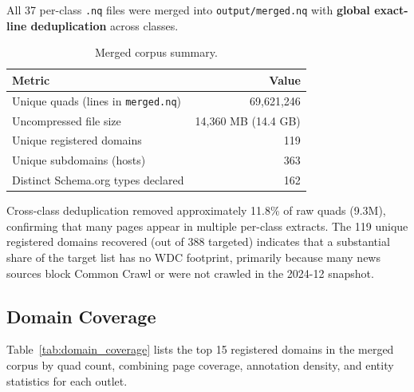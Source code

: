 \documentclass[11pt,a4paper]{article}
\begin{document}
All 37 per-class \texttt{.nq} files were merged into
\texttt{output/merged.nq} with \textbf{global exact-line deduplication} across
classes.  

\begin{table}[H]
\centering
\caption{Merged corpus summary.}
\label{tab:merged_summary}
\begin{tabular}{lr}
\toprule
\textbf{Metric} & \textbf{Value} \\
\midrule
Unique quads (lines in \texttt{merged.nq}) & 69{,}621{,}246 \\
Uncompressed file size & 14{,}360 MB (14.4 GB) \\
Unique registered domains & 119 \\
Unique subdomains (hosts) & 363 \\
Distinct Schema.org types declared & 162 \\
\bottomrule
\end{tabular}
\end{table}

Cross-class deduplication removed approximately 11.8\% of raw quads (9.3M),
confirming that many pages appear in multiple per-class extracts.
The 119 unique registered domains recovered (out of 388 targeted) indicates
that a substantial share of the target list has no WDC footprint, primarily
because many news sources block Common Crawl or were not crawled in the 2024-12
snapshot.

\subsection{Domain Coverage}

Table~\ref{tab:domain_coverage} lists the top 15 registered domains in the merged corpus by quad count,
combining page coverage, annotation density, and entity statistics for each outlet.
\end{document}
